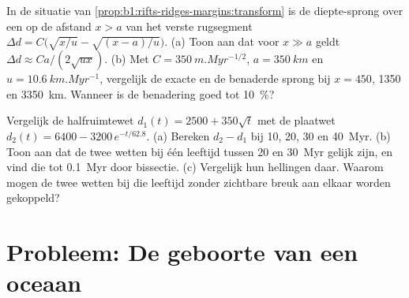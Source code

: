 \begin{exercise}[$\star\star\star$]\label{exo:b1:rifts-ridges-margins:11}
In de situatie van \cref{prop:b1:rifts-ridges-margins:transform} is de diepte-sprong over een  op de afstand $x > a$ van het verste rugsegment $\Delta d = C\bigl(\sqrt{x/u} - \sqrt{(x - a)/u}\bigr)$. (a) Toon aan dat voor $x \gg a$ geldt $\Delta d \approx Ca/(2\sqrt{ux})$. (b) Met
$C = \qty{350}{m.Myr^{-1/2}}$, $a = \qty{350}{km}$ en
$u = \qty{10.6}{km.Myr^{-1}}$, vergelijk de exacte en de benaderde sprong bij
$x = 450$, 1350 en \qty{3350}{km}. Wanneer is de benadering goed tot
\qty{10}{\percent}?
\end{exercise}

\begin{exercise}[$\star\star\star$]\label{exo:b1:rifts-ridges-margins:12}
Vergelijk de halfruimtewet $d_1(t) = 2500 + 350\sqrt t$ met de plaatwet $d_2(t) = 6400 - 3200\,e^{-t/62.8}$. (a) Bereken $d_2 - d_1$ bij 10, 20, 30 en \qty{40}{Myr}. (b) Toon aan dat de twee wetten bij één leeftijd tussen 20 en \qty{30}{Myr} gelijk zijn, en vind die tot \qty{0.1}{Myr} door bissectie. (c) Vergelijk hun hellingen daar. Waarom mogen de twee wetten bij die leeftijd zonder zichtbare breuk aan elkaar worden gekoppeld?
\end{exercise}

\section{Probleem: De geboorte van een oceaan}

